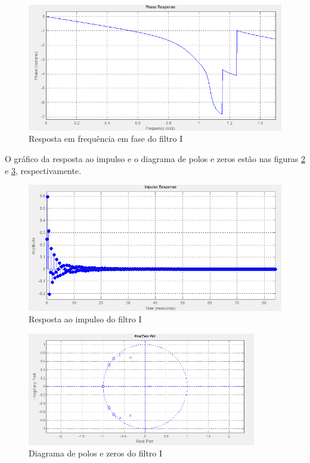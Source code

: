 \documentclass[a4paper,10pt]{article}
\begin{document}
\begin{figure}[ht]
 \centering
 \includegraphics[width=12cm]{pictures/Filtro1/Fase.png}
 \caption{Resposta em frequência em fase do filtro I}
 \label{fig:fase1}
\end{figure}

O gráfico da resposta ao impulso e o diagrama de polos e zeros estão nas figuras \ref{fig:resimp1} e \ref{fig:diapolozero1}, respectivamente.

\begin{figure}[ht]
 \centering
 \includegraphics[width=12cm]{pictures/Filtro1/RespImpulso.png}
 \caption{Resposta ao impulso do filtro I}
 \label{fig:resimp1}
\end{figure}

\begin{figure}[ht]
 \centering
 \includegraphics[width=10cm]{pictures/Filtro1/Polos&Zeros.png}
 \caption{Diagrama de polos e zeros do filtro I}
 \label{fig:diapolozero1}
\end{figure}
\end{document}
